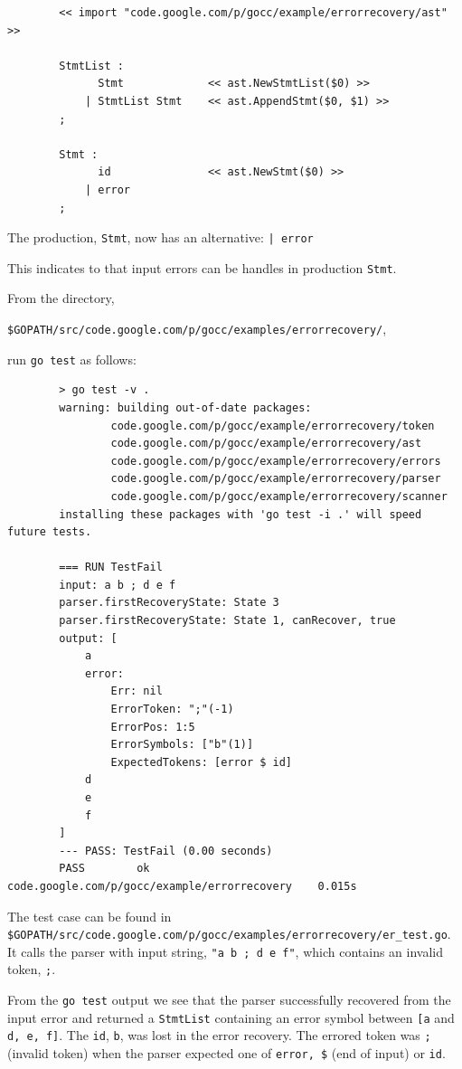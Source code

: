 \documentclass[12pt]{article}
\begin{document}
	\begin{verbatim}
		<< import "code.google.com/p/gocc/example/errorrecovery/ast" >>

		StmtList : 
		      Stmt             << ast.NewStmtList($0) >>
		    | StmtList Stmt    << ast.AppendStmt($0, $1) >>
		;

		Stmt : 
		      id               << ast.NewStmt($0) >>
		    | error
		;
	\end{verbatim}

	The production, \verb|Stmt|, now has an alternative: \verb"| error"

	This indicates to \gocc that input errors can be handles in production \verb|Stmt|.

	From the directory, 

	\verb|$GOPATH/src/code.google.com/p/gocc/examples/errorrecovery/|, 

	run \verb|go test| as follows:

	\begin{verbatim}
		> go test -v .
		warning: building out-of-date packages:
		        code.google.com/p/gocc/example/errorrecovery/token
		        code.google.com/p/gocc/example/errorrecovery/ast
		        code.google.com/p/gocc/example/errorrecovery/errors
		        code.google.com/p/gocc/example/errorrecovery/parser
		        code.google.com/p/gocc/example/errorrecovery/scanner
		installing these packages with 'go test -i .' will speed future tests.

		=== RUN TestFail
		input: a b ; d e f
		parser.firstRecoveryState: State 3
		parser.firstRecoveryState: State 1, canRecover, true
		output: [
		    a
		    error:
		        Err: nil
		        ErrorToken: ";"(-1)
		        ErrorPos: 1:5
		        ErrorSymbols: ["b"(1)]
		        ExpectedTokens: [error $ id]
		    d
		    e
		    f
		]
		--- PASS: TestFail (0.00 seconds)
		PASS		ok      code.google.com/p/gocc/example/errorrecovery	0.015s
	\end{verbatim}

	The test case can be found in \\
	\verb|$GOPATH/src/code.google.com/p/gocc/examples/errorrecovery/er_test.go|. \\
	It calls the parser with input string, \verb|"a b ; d e f"|, which contains an invalid token, \verb|;|.

	From the \verb|go test| output we see that the parser successfully recovered from the input error and returned a \verb|StmtList| containing an error symbol between \verb|[a| and \verb|d, e, f]|. The \verb|id|, \verb|b|, was lost in the error recovery. The errored token was \verb|;| (invalid token) when the parser expected one of \verb|error, $| (end of input) or \verb|id|.
\end{document}
